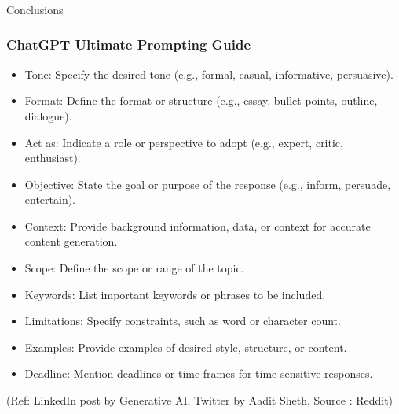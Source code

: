 \begin{frame}[fragile]\frametitle{}
\begin{center}
{\Large Conclusions}
\end{center}
\end{frame}

\begin{frame}[fragile]\frametitle{ChatGPT Ultimate Prompting Guide}

\begin{itemize}
\item Tone: Specify the desired tone (e.g., formal, casual, informative, persuasive).
\item Format: Define the format or structure (e.g., essay, bullet points, outline, dialogue). 
\item Act as: Indicate a role or perspective to adopt (e.g., expert, critic, enthusiast). 
\item Objective: State the goal or purpose of the response (e.g., inform, persuade, entertain). 
\item Context: Provide background information, data, or context for accurate content generation. 
\item Scope: Define the scope or range of the topic.
\item Keywords: List important keywords or phrases to be included.
\item Limitations: Specify constraints, such as word or character count.
\item Examples: Provide examples of desired style, structure, or content.
\item Deadline: Mention deadlines or time frames for time-sensitive responses. 
\end{itemize}	 


{\tiny (Ref: LinkedIn post by Generative AI, Twitter by Aadit Sheth, Source : Reddit)}
			

\end{frame}


